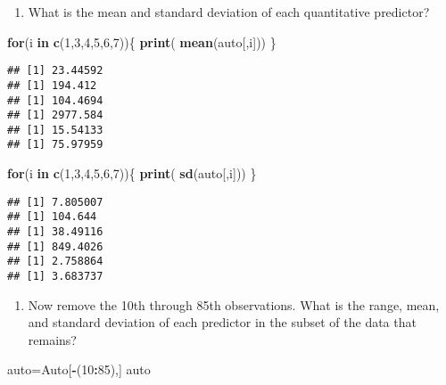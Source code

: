 \documentclass[
]{article}
\newenvironment{Shaded}{\begin{snugshade}}{\end{snugshade}}
\newcommand{\ControlFlowTok}[1]{\textcolor[rgb]{0.13,0.29,0.53}{\textbf{#1}}}
\newcommand{\DecValTok}[1]{\textcolor[rgb]{0.00,0.00,0.81}{#1}}
\newcommand{\FunctionTok}[1]{\textcolor[rgb]{0.13,0.29,0.53}{\textbf{#1}}}
\newcommand{\NormalTok}[1]{#1}
\newcommand{\OtherTok}[1]{\textcolor[rgb]{0.56,0.35,0.01}{#1}}
\newcommand{\SpecialCharTok}[1]{\textcolor[rgb]{0.81,0.36,0.00}{\textbf{#1}}}
\providecommand{\tightlist}{%
  \setlength{\itemsep}{0pt}\setlength{\parskip}{0pt}}
\begin{document}
\begin{enumerate}
\def\labelenumi{(\alph{enumi})}
\setcounter{enumi}{2}
\tightlist
\item
  What is the mean and standard deviation of each quantitative
  predictor?
\end{enumerate}

\begin{Shaded}
\begin{Highlighting}[]
\ControlFlowTok{for}\NormalTok{(i }\ControlFlowTok{in} \FunctionTok{c}\NormalTok{(}\DecValTok{1}\NormalTok{,}\DecValTok{3}\NormalTok{,}\DecValTok{4}\NormalTok{,}\DecValTok{5}\NormalTok{,}\DecValTok{6}\NormalTok{,}\DecValTok{7}\NormalTok{))\{}
 \FunctionTok{print}\NormalTok{( }\FunctionTok{mean}\NormalTok{(auto[,i]))}
\NormalTok{\}}
\end{Highlighting}
\end{Shaded}

\begin{verbatim}
## [1] 23.44592
## [1] 194.412
## [1] 104.4694
## [1] 2977.584
## [1] 15.54133
## [1] 75.97959
\end{verbatim}

\begin{Shaded}
\begin{Highlighting}[]
\ControlFlowTok{for}\NormalTok{(i }\ControlFlowTok{in} \FunctionTok{c}\NormalTok{(}\DecValTok{1}\NormalTok{,}\DecValTok{3}\NormalTok{,}\DecValTok{4}\NormalTok{,}\DecValTok{5}\NormalTok{,}\DecValTok{6}\NormalTok{,}\DecValTok{7}\NormalTok{))\{}
 \FunctionTok{print}\NormalTok{( }\FunctionTok{sd}\NormalTok{(auto[,i]))}
\NormalTok{\}}
\end{Highlighting}
\end{Shaded}

\begin{verbatim}
## [1] 7.805007
## [1] 104.644
## [1] 38.49116
## [1] 849.4026
## [1] 2.758864
## [1] 3.683737
\end{verbatim}

\begin{enumerate}
\def\labelenumi{(\alph{enumi})}
\setcounter{enumi}{3}
\tightlist
\item
  Now remove the 10th through 85th observations. What is the range,
  mean, and standard deviation of each predictor in the subset of the
  data that remains?
\end{enumerate}

\begin{Shaded}
\begin{Highlighting}[]
\NormalTok{auto}\OtherTok{=}\NormalTok{Auto[}\SpecialCharTok{{-}}\NormalTok{(}\DecValTok{10}\SpecialCharTok{:}\DecValTok{85}\NormalTok{),]}
\NormalTok{auto}
\end{Highlighting}
\end{Shaded}
\end{document}
